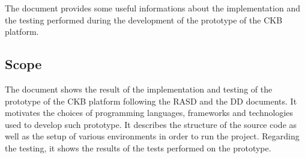 \setlength{\headheight}{13.59999pt}
\addtolength{\topmargin}{-1.59999pt}

The document provides some useful informations about the implementation and the testing performed during the development of the prototype of the CKB platform. 

\subsection{Scope}
The document shows the result of the implementation and testing of the prototype of the CKB platform following the RASD and the DD documents. It motivates the choices of programming languages, frameworks and technologies used to develop such prototype. It describes the structure of the source code as well as the setup of various environments in order to run the project. Regarding the testing, it shows the results of the tests performed on the prototype.